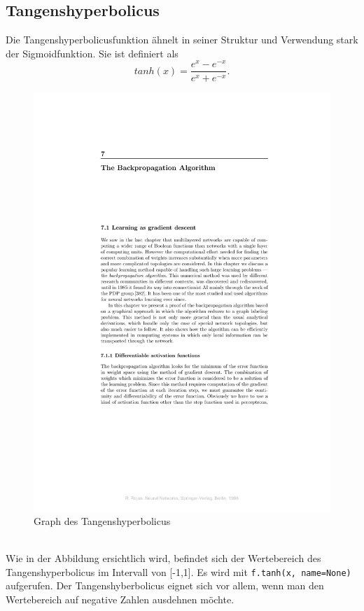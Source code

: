 \subsection{Tangenshyperbolicus}
Die Tangenshyperbolicusfunktion ähnelt in seiner Struktur und Verwendung stark der Sigmoidfunktion. Sie ist definiert als \cite{Bishop1995}
\begin{equation}
tanh(x)=\frac{e^x - e^{-x}}{e^x + e^{-x}}.
\end{equation}
\begin{figure}[!htp]
	\includegraphics[page=3,trim = 10.3cm 22cm 5cm 4.7cm,clip=true,scale=1.4]{images/BackPropRojas.pdf}
	\centering
	\caption{Graph des Tangenshyperbolicus \cite{Rojas1996}}
\end{figure}\\
Wie in der Abbildung ersichtlich wird, befindet sich der Wertebereich des Tangenshyperbolicus im Intervall von [-1,1]. Es wird mit \lstinline$f.tanh(x, name=None)$\cite{building} aufgerufen. 
Der Tangenshyberbolicus eignet sich vor allem, wenn man den Wertebereich auf negative Zahlen ausdehnen möchte.\cite{cookbook}
